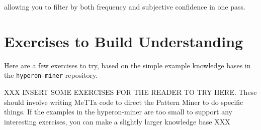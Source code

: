 \documentclass{article}
\begin{document}
allowing you to filter by both frequency and subjective confidence in one pass.

\section{Exercises to Build Understanding}

Here are a few exercises to try, based on the simple example knowledge bases in the \texttt{hyperon-miner}  repository.

XXX INSERT SOME EXERCISES FOR THE READER TO TRY HERE.   These should involve writing MeTTa code to direct the Pattern Miner to do specific things.   If the examples in the hyperon-miner are too small to support any interesting exercises, you can make a slightly larger knowledge base XXX
\end{document}
